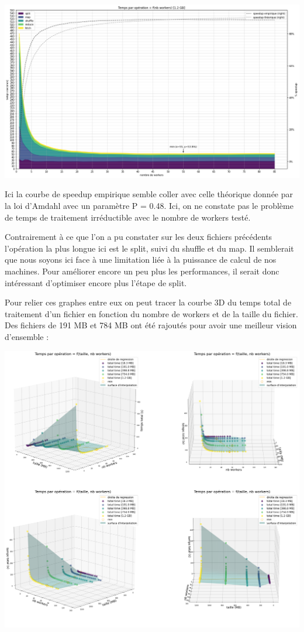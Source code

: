 \documentclass[11pt,a4paper]{article}
\begin{document}
\includegraphics[width=\columnwidth]{graph3.png}

Ici la courbe de speedup empirique semble coller avec celle théorique donnée par la loi d'Amdahl avec un paramètre P = 0.48. Ici, on ne constate pas le problème de temps de traitement irréductible avec le nombre de workers testé.

Contrairement à ce que l'on a pu constater sur les deux fichiers précédents l'opération la plus longue ici est le split, suivi du shuffle et du map. Il semblerait que nous soyons ici face à une limitation liée à la puissance de calcul de nos machines. Pour améliorer encore un peu plus les performances, il serait donc intéressant d'optimiser encore plus l'étape de split.

Pour relier ces graphes entre eux on peut tracer la courbe 3D du temps total de traitement d'un fichier en fonction du nombre de workers et de la taille du fichier. Des fichiers de 191 MB et 784 MB ont été rajoutés pour avoir une meilleur vision d'ensemble :

\includegraphics[width=\columnwidth]{graph4.png}
\end{document}

